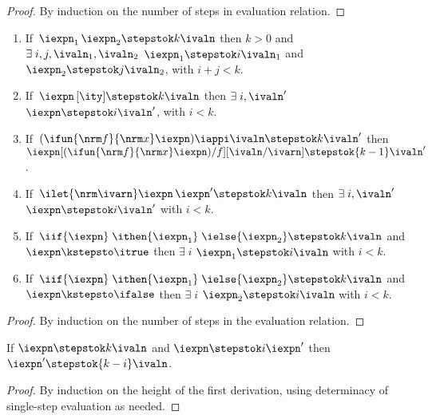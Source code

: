 {\begin{proof}
  By induction on the number of steps in evaluation relation.
\end{proof}

\begin{lemma}
  \begin{enumerate}
  \item If $\, \iexpn_1 \, \iexpn_2 \stepstok k \ivaln$ then $k > 0$ and
    $\exists\;i,j,\ivaln_1,\ivaln_2$ \suchthat{} $\iexpn_1 \stepstok i \ivaln_1$ and $\iexpn_2 \stepstok j
      \ivaln_2$, with $i+j < k$.
  \item If $\, \iexpn\,[\ity] \stepstok k \ivaln$ then
    $\exists\;i,\ivaln'$ \suchthat{} $\iexpn \stepstok i
    \ivaln'$, with $i < k$.
  \item If $\, (\ifun {\nrm f} {\nrm x} \iexpn) \iappi \ivaln \stepstok k \ivaln'$ then
    $\iexpn[(\ifun {\nrm f} {\nrm x} \iexpn)/f][\ivaln/\ivarn] \stepstok {k-1} \ivaln'$.
  \item If $\, \ilet {\nrm \ivarn} \iexpn \, \iexpn' \stepstok k
    \ivaln$ then $\exists\;i,\ivaln'$ \suchthat{} $\iexpn
    \stepstok i \ivaln'$ with $i < k$. 
  \item If $\, \iif{\iexpn}\;\ithen {\iexpn_1}\; \ielse{\iexpn_2} \stepstok
    k \ivaln$ and $\iexpn \kstepsto \itrue$ then $\exists\;i$ \suchthat{} $\iexpn_1 \stepstok i
    \ivaln$ with $i < k$.
  \item If $\, \iif{\iexpn}\;\ithen {\iexpn_1}\; \ielse{\iexpn_2} \stepstok
    k \ivaln$ and $\iexpn \kstepsto \ifalse$ then $\exists\;i$ \suchthat{} $\iexpn_2 \stepstok i
    \ivaln$ with $i < k$.
  \end{enumerate}
\label{lemma:kleene-eval-inv}
\end{lemma}

\begin{proof}
  By induction on the number of steps in the evaluation relation.
\end{proof}

\begin{lemma}
  If $\iexpn \stepstok k \ivaln$ and $\iexpn \stepstok i \iexpn'$ then
  $\iexpn' \stepstok {k-i} \ivaln$.
  \label{lemma:eval-unique}
\end{lemma}

\begin{proof}
  By induction on the height of the first derivation, using
  determinacy of single-step evaluation as needed.
\end{proof}
} %

